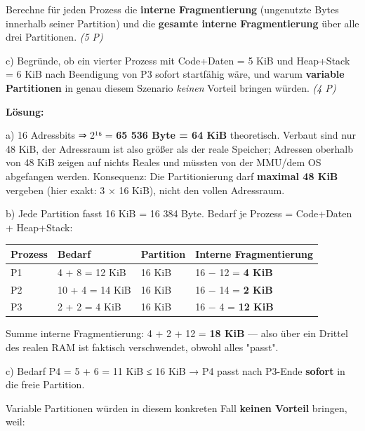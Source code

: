 \documentclass[11pt, a4paper]{article}
\begin{document}
Berechne für jeden Prozess die \textbf{interne Fragmentierung} (ungenutzte Bytes innerhalb seiner Partition) und die \textbf{gesamte interne Fragmentierung} über alle drei Partitionen. \textit{(5 P)}


c) Begründe, ob ein vierter Prozess mit Code+Daten = 5 KiB und Heap+Stack = 6 KiB nach Beendigung von P3 sofort startfähig wäre, und warum \textbf{variable Partitionen} in genau diesem Szenario \textit{keinen} Vorteil bringen würden. \textit{(4 P)}


\textbf{Lösung:}


a) 16 Adressbits ⇒ 2¹⁶ = \textbf{65 536 Byte = 64 KiB} theoretisch. Verbaut sind nur 48 KiB, der Adressraum ist also größer als der reale Speicher; Adressen oberhalb von 48 KiB zeigen auf nichts Reales und müssten von der MMU/dem OS abgefangen werden. Konsequenz: Die Partitionierung darf \textbf{maximal 48 KiB} vergeben (hier exakt: 3 × 16 KiB), nicht den vollen Adressraum.


b) Jede Partition fasst 16 KiB = 16 384 Byte. Bedarf je Prozess = Code+Daten + Heap+Stack:



{\small
\begin{tabularx}{\linewidth}{XXXX}
\hline
\rowcolor{tableheadbg}
{\color{white}\textbf{Prozess}} & {\color{white}\textbf{Bedarf}} & {\color{white}\textbf{Partition}} & {\color{white}\textbf{Interne Fragmentierung}} \\[2pt]
\hline
\endhead
\hline
\endfoot
P1 & 4 + 8 = 12 KiB & 16 KiB & 16 − 12 = \textbf{4 KiB} \\
P2 & 10 + 4 = 14 KiB & 16 KiB & 16 − 14 = \textbf{2 KiB} \\
P3 & 2 + 2 = 4 KiB & 16 KiB & 16 − 4 = \textbf{12 KiB} \\
\end{tabularx}
}


Summe interne Fragmentierung: 4 + 2 + 12 = \textbf{18 KiB} — also über ein Drittel des realen RAM ist faktisch verschwendet, obwohl alles "passt".


c) Bedarf P4 = 5 + 6 = 11 KiB ≤ 16 KiB → P4 passt nach P3-Ende \textbf{sofort} in die freie Partition.

Variable Partitionen würden in diesem konkreten Fall \textbf{keinen Vorteil} bringen, weil:
\end{document}
